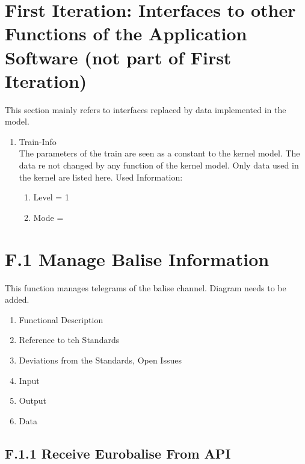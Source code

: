 \documentclass{template/openetcs_report}
\begin{document}
\section{First Iteration: Interfaces to other Functions of the Application Software (not part of First Iteration)}
This section mainly refers to interfaces replaced by data implemented in the model.

\begin{enumerate}
\item Train-Info\\
The parameters of the train are seen as a constant to the kernel model. The data re not changed by any function of the kernel model. Only data used in the kernel are listed here.
Used Information:
\begin{enumerate}
\item Level = 1\\
\item Mode = \\
\end{enumerate}
\end{enumerate}


\section{F.1 Manage Balise Information}
This function manages telegrams of the balise channel. 
Diagram needs to be added.

\begin{enumerate}
\item Functional Description
\item Reference to teh Standards
\item Deviations from the Standards, Open Issues
\item Input
\item Output
\item Data
\end{enumerate}

\subsection{F.1.1 Receive Eurobalise From API}\label{ss:ReceiveEurobaliseFromAPI}
\end{document}
